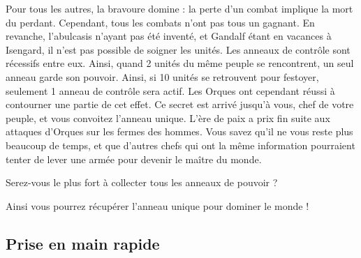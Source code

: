 \newline
Pour tous les autres, la bravoure domine : la perte d'un combat implique la mort du perdant. Cependant, tous les combats n'ont pas tous un gagnant. En revanche, l'abulcasis n'ayant pas été inventé, et Gandalf étant en vacances à Isengard, il n'est pas possible de soigner les unités.
\newline
\newline
Les anneaux de contrôle sont récessifs entre eux. Ainsi, quand 2 unités du même peuple se rencontrent, un seul anneau garde son pouvoir. Ainsi, si 10 unités se retrouvent pour festoyer, seulement 1 anneau de contrôle sera actif. Les Orques ont cependant réussi à contourner une partie de cet effet.
\newpage
Ce secret est arrivé jusqu'à vous, chef de votre peuple, et vous convoitez l'anneau unique. L'ère de paix a prix fin suite aux attaques d'Orques sur les fermes des hommes.  Vous savez qu'il ne vous reste plus beaucoup de temps, et que d'autres chefs qui ont la même information pourraient tenter de lever une armée pour devenir le maître du monde.
\newline
\begin{center}
Serez-vous le plus fort à collecter tous les anneaux de pouvoir ?
\end{center}
\begin{center}
Ainsi vous pourrez récupérer l'anneau unique pour dominer le monde !
\end{center}

\subsection{Prise en main rapide}

